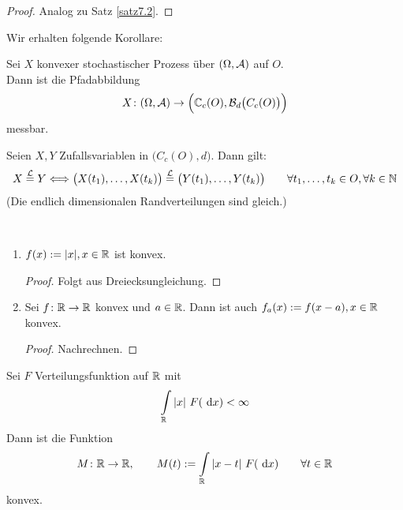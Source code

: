 \begin{proof}
	Analog zu Satz \ref{satz7.2}.
\end{proof}


Wir erhalten folgende Korollare:

\begin{korollar}\label{korollar9.3}
	 Sei $X$ konvexer stochastischer Prozess über $(\Omega,\mathcal{A})$ auf $O$.\\
	 Dann ist die Pfadabbildung
	 \begin{align*}
	 	X\colon(\Omega,\mathcal{A})\to\Big(\mathbb{C}_c(O),\mathcal{B}_d\big(C_c(O)\big)\Big)
	 \end{align*}
	 messbar.
\end{korollar}

\begin{korollar}\label{korollar9.4} %
	Seien $X,Y$ Zufallsvariablen in $\big(C_c(O),d\big)$.
	Dann gilt:
	\begin{align*}
		X\overset{\mathcal{L}}{=} Y\Longleftrightarrow
		\big(X(t_1),\ldots,X(t_k)\big)
		\overset{\mathcal{L}}{=}
		\big(Y(t_1),\ldots,Y(t_k)\big)
		\qquad\forall t_1,\ldots,t_k\in O,\forall k\in\mathbb{N}
	\end{align*}
	(Die endlich dimensionalen Randverteilungen sind gleich.)
\end{korollar}

\begin{beispiel}\label{beispiel9.5}\
	\begin{enumerate}[label=(\arabic*)]
		\item $f(x):=|x|,x\in\mathbb{R}$ ist konvex.
		\begin{proof}
			Folgt aus Dreiecksungleichung.
		\end{proof}
		\item Sei $f\colon\mathbb{R}\to\mathbb{R}$ konvex und $a\in\mathbb{R}$.
		Dann ist auch $f_a(x):=f(x-a),x\in\mathbb{R}$ konvex.
		\begin{proof}
			Nachrechnen.
		\end{proof}
	\end{enumerate}
\end{beispiel}

\begin{lemma}\label{lemma9.6}
	Sei $F$ Verteilungsfunktion auf $\mathbb{R}$ mit
	\begin{align*}
		\int\limits_{\mathbb{R}} |x|~F(\text{ d} x)<\infty
	\end{align*}
	Dann ist die Funktion
	\begin{align*}
		M\colon\mathbb{R}\to\mathbb{R},\qquad M(t):=\int\limits_{\mathbb{R}}|x-t|~F(\text{ d} x)\qquad\forall t\in\mathbb{R}
	\end{align*}
	konvex.
\end{lemma}

